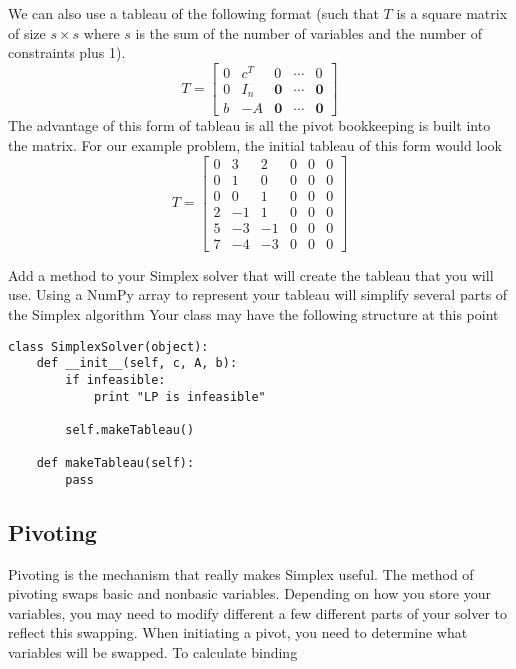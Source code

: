 We can also use a tableau of the following format (such that $T$ is a square matrix of size $s \times s$ 
where $s$ is the sum of the number of variables and the number of constraints plus 1).
\begin{equation}
T = \begin{bmatrix}
    0 & c^T   & 0 & \cdots & 0 \\
    0 & I_n & \boldsymbol{0} & \cdots & \boldsymbol{0} \\
    b & -A  & \boldsymbol{0} & \cdots & \boldsymbol{0}
\end{bmatrix}
\label{eqn:matrix_tab}
\end{equation}
The advantage of this form of tableau is all the pivot bookkeeping is built into the matrix.
For our example problem, the initial tableau of this form would look
\begin{equation*}
T = \begin{bmatrix}
        0 & 3 & 2 & 0 & 0 & 0 \\
        0 & 1 & 0 & 0 & 0 & 0 \\
        0 & 0 & 1 & 0 & 0 & 0 \\
        2 &-1 & 1 & 0 & 0 & 0 \\
        5 &-3 &-1 & 0 & 0 & 0 \\
        7 &-4 &-3 & 0 & 0 & 0
\end{bmatrix}
\end{equation*}

\begin{problem}
Add a method to your Simplex solver that will create the tableau that you will use.
Using a NumPy array to represent your tableau will simplify several parts of the Simplex algorithm
Your class may have the following structure at this point
\begin{lstlisting}
class SimplexSolver(object):
    def __init__(self, c, A, b):
        if infeasible:
            print "LP is infeasible"
            
        self.makeTableau()
        
    def makeTableau(self):
        pass
\end{lstlisting}
\label{prob:maketableau}
\end{problem}

\subsection{Pivoting}
Pivoting is the mechanism that really makes Simplex useful.
The method of pivoting swaps basic and nonbasic variables.
Depending on how you store your variables, you may need to modify different a few different parts of your solver to reflect this swapping.
When initiating a pivot, you need to determine what variables will be swapped.
To calculate binding 

